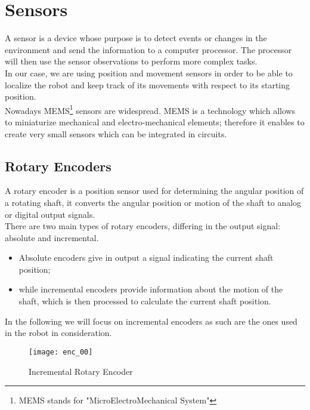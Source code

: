 \chapter{Sensors}

A sensor is a device whose purpose is to detect events or changes in the environment and send the information to a computer processor. The processor will then use the sensor observations to perform more complex tasks.\\
In our case, we are using position and movement sensors in order to be able to localize the robot and keep track of its movements with respect to its starting position.\\

Nowadays MEMS\footnote{MEMS stands for "MicroElectroMechanical System"} sensors are widespread. MEMS is a technology which allows to miniaturize mechanical and electro-mechanical elements; therefore it enables to create very small sensors which can be integrated in circuits.\\

\section{Rotary Encoders}

A rotary encoder is a position sensor used for determining the angular position of a rotating shaft, it converts the angular position or motion of the shaft to analog or digital output signals.\\
There are two main types of rotary encoders, differing in the output signal: absolute and incremental.
\begin{itemize}
	\item Absolute encoders give in output a signal indicating the current shaft position;
	\item while incremental encoders provide information about the motion of the shaft, which is then processed to calculate the current shaft position.\\
\end{itemize}
In the following we will focus on incremental encoders as such are the ones used in the robot in consideration.\\


\begin{figure}[!ht]
	\texttt{[image: enc\_00]}
	\captionsetup{justification=centering, margin=1.5cm}
	\centering
	\caption{Incremental Rotary Encoder}
	\centering
\end{figure}


